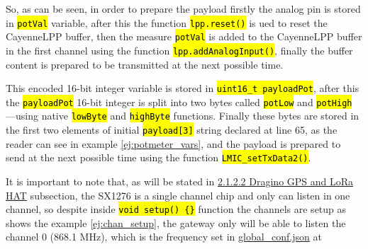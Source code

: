 \documentclass[11pt,a4paper,dvipsnames,twoside]{article}
\newcommand{\doubt}[1] {\textbf{\color{Red3}#1}}
\newcommand{\cmd}[1] {\hl{\texttt{#1}}}
\begin{document}
So, as can be seen, in order to prepare the payload firstly the analog pin is stored in \cmd{potVal} variable, after this the function \cmd{lpp.reset()} is ued to reset the CayenneLPP buffer, then the measure \cmd{potVal} is added to the CayenneLPP buffer in the first channel using the function \cmd{lpp.addAnalogInput()}, finally the buffer content is prepared to be transmitted at the next possible time.

This encoded 16-bit integer variable is stored in \cmd{uint16\_t payloadPot}, after this the \cmd{payloadPot} 16-bit integer is split into two bytes called \cmd{potLow} and \cmd{potHigh} ---using native \cmd{lowByte} and \cmd{highByte} functions. Finally these bytes are stored in the first two elements of initial \cmd{payload[3]} string declared at line 65, as the reader can see in example \ref{ej:potmeter_vars}, and the payload is prepared to send at the next possible time using the function \cmd{LMIC\_setTxData2()}.

It is important to note that, as will be stated in \hyperlink{Raspi_HAT}{2.1.2.2 Dragino GPS and LoRa HAT} subsection, the SX1276 is a single channel chip and only can listen in one channel, so despite inside \cmd{void setup() \{\}} function the channels are setup as shows the example \ref{ej:chan_setup}, the gateway only will be able to listen the channel 0 (868.1 \si{\mega\hertz}), which is the frequency set in \href{https://github.com/dragino/dual_chan_pkt_fwd/blob/master/global_conf.json}{global\_conf.json} at \cite{Dragino_DualChannelController_Rpi}
\end{document}

